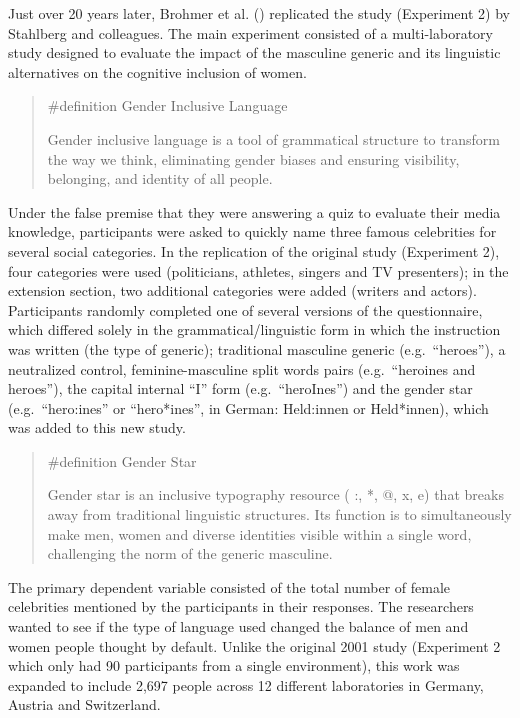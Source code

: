 \documentclass[
  letterpaper,
]{book}
\begin{document}
Just over 20 years later, Brohmer et al.
() replicated the study
(Experiment 2) by Stahlberg and colleagues. The main experiment
consisted of a multi-laboratory study designed to evaluate the impact of
the masculine generic and its linguistic alternatives on the cognitive
inclusion of women.

\begin{quote}
\label{def-genderinclusivelanguage}{\#definition} Gender
Inclusive Language

Gender inclusive language is a tool of grammatical structure to
transform the way we think, eliminating gender biases and ensuring
visibility, belonging, and identity of all people.
\end{quote}

Under the false premise that they were answering a quiz to evaluate
their media knowledge, participants were asked to quickly name three
famous celebrities for several social categories. In the replication of
the original study (Experiment 2), four categories were used
(politicians, athletes, singers and TV presenters); in the extension
section, two additional categories were added (writers and actors).
Participants randomly completed one of several versions of the
questionnaire, which differed solely in the grammatical/linguistic form
in which the instruction was written (the type of generic); traditional
masculine generic (e.g.~``heroes''), a neutralized control,
feminine-masculine split words pairs (e.g.~``heroines and heroes''), the
capital internal ``I'' form (e.g.~``heroInes'') and the gender star
(e.g.~``hero:ines'' or ``hero*ines'', in German: Held:innen or
Held*innen), which was added to this new study.

\begin{quote}
\label{def-genderstar}{\#definition} Gender Star

Gender star is an inclusive typography resource ( :, *, @, x, e) that
breaks away from traditional linguistic structures. Its function is to
simultaneously make men, women and diverse identities visible within a
single word, challenging the norm of the generic masculine.
\end{quote}

The primary dependent variable consisted of the total number of female
celebrities mentioned by the participants in their responses. The
researchers wanted to see if the type of language used changed the
balance of men and women people thought by default. Unlike the original
2001 study (Experiment 2 which only had 90 participants from a single
environment), this work was expanded to include 2,697 people across 12
different laboratories in Germany, Austria and Switzerland.
\end{document}
